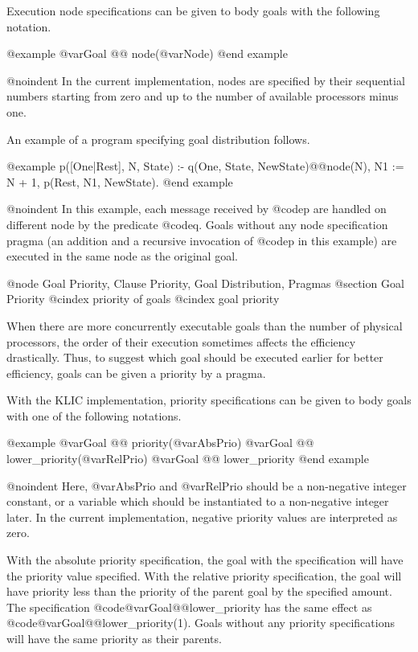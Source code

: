 {Execution node specifications can be given to body goals with the
following notation.

@example
@var{Goal} @@ node(@var{Node})
@end example

@noindent
In the current implementation, nodes are specified by their sequential
numbers starting from zero and up to the number of available processors
minus one.

An example of a program specifying goal distribution follows.

@example
p([One|Rest], N, State) :-
    q(One, State, NewState)@@node(N),
    N1 := N + 1,
    p(Rest, N1, NewState).
@end example

@noindent
In this example, each message received by @code{p} are handled on
different node by the predicate @code{q}.  Goals without any node
specification pragma (an addition and a recursive invocation of @code{p}
in this example) are executed in the same node as the original goal.

@node Goal Priority, Clause Priority, Goal Distribution, Pragmas
@section Goal Priority
@cindex priority of goals
@cindex goal priority

When there are more concurrently executable goals than the number of
physical processors, the order of their execution sometimes affects the
efficiency drastically.  Thus, to suggest which goal should be executed
earlier for better efficiency, goals can be given a priority by a
pragma.

With the KLIC implementation, priority specifications can be given to
body goals with one of the following notations.

@example
@var{Goal} @@ priority(@var{AbsPrio})
@var{Goal} @@ lower_priority(@var{RelPrio})
@var{Goal} @@ lower_priority
@end example

@noindent
Here, @var{AbsPrio} and @var{RelPrio} should be a non-negative integer
constant, or a variable which should be instantiated to a non-negative
integer later.  In the current implementation, negative priority values
are interpreted as zero.

With the absolute priority specification, the goal with the
specification will have the priority value specified.  With the relative
priority specification, the goal will have priority less than the
priority of the parent goal by the specified amount.  The specification
@code{@var{Goal}@@lower_priority} has the same effect as
@code{@var{Goal}@@lower_priority(1)}.  Goals without any priority
specifications will have the same priority as their parents.

}
